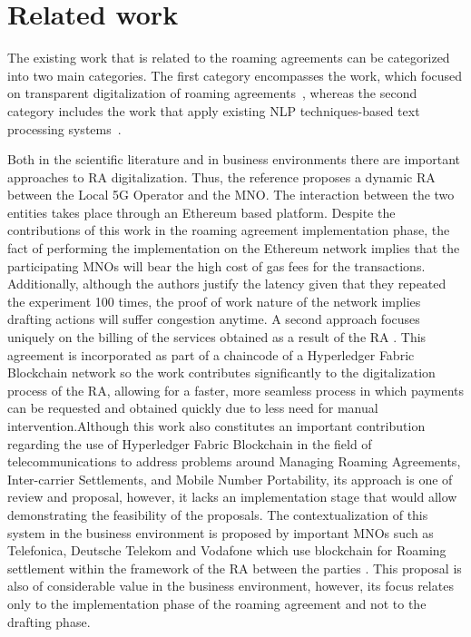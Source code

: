 \section{Related work}

The existing work that is related to the roaming agreements can be categorized into two main categories. The first category encompasses the work, which focused on transparent digitalization of roaming agreements~\cite{9369516, 9024541, Huillet2020}, whereas the second category includes the work that apply existing NLP techniques-based text processing systems~\cite{8487847, 9138070, 9104105}.

Both in the scientific literature and in business environments there are important approaches to RA digitalization. Thus, the reference \cite{9369516} proposes a dynamic RA between the Local 5G Operator and the MNO. The interaction between the two entities takes place through an Ethereum based platform. Despite the contributions of this work in the roaming agreement implementation phase, the fact of performing the implementation on the Ethereum network implies that the participating MNOs will bear the high cost of gas fees for the transactions. Additionally, although the authors justify the latency given that they repeated the experiment 100 times, the proof of work nature of the network implies drafting actions will suffer congestion anytime. A second approach focuses uniquely on the billing of the services obtained as a result of the RA \cite{9024541}. This agreement is incorporated as part of a chaincode of a Hyperledger Fabric Blockchain network so the work contributes significantly to the digitalization process of the RA, allowing for a faster, more seamless process in which payments can be requested and obtained quickly due to less need for manual intervention.Although this work also constitutes an important contribution regarding the use of Hyperledger Fabric Blockchain in the field of telecommunications to address problems around Managing Roaming Agreements, Inter-carrier Settlements, and Mobile Number Portability, its approach is one of review and proposal, however, it lacks an implementation stage that would allow demonstrating the feasibility of the proposals. The contextualization of this system in the business environment is proposed by important MNOs such as Telefonica, Deutsche Telekom and Vodafone which use blockchain for Roaming settlement within the framework of the RA between the parties \cite{Huillet2020}. This proposal is also of considerable value in the business environment, however, its focus relates only to the implementation phase of the roaming agreement and not to the drafting phase. 

